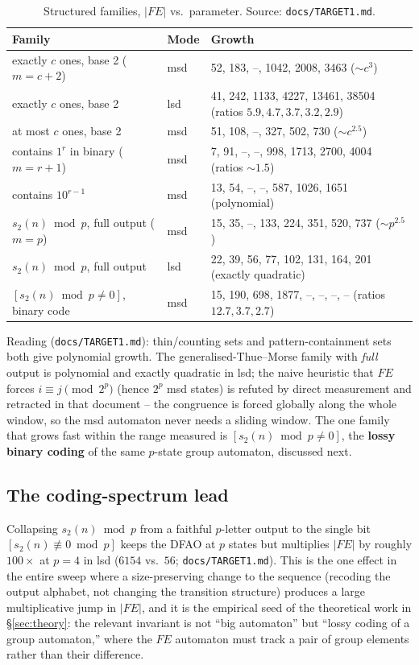 \documentclass[11pt]{article}
\begin{document}
\begin{table}[h]
\centering
\caption{Structured families, $|FE|$ vs.\ parameter. Source: \texttt{docs/TARGET1.md}.}
\label{tab:struct}
\begin{tabular}{@{}lll@{}}
\toprule
Family & Mode & Growth \\
\midrule
exactly $c$ ones, base 2 ($m=c+2$) & msd & 52, 183, --, 1042, 2008, 3463 ($\sim c^3$) \\
exactly $c$ ones, base 2 & lsd & 41, 242, 1133, 4227, 13461, 38504 (ratios $5.9,4.7,3.7,3.2,2.9$) \\
at most $c$ ones, base 2 & msd & 51, 108, --, 327, 502, 730 ($\sim c^{2.5}$) \\
contains $1^r$ in binary ($m=r+1$) & msd & 7, 91, --, --, 998, 1713, 2700, 4004 (ratios $\sim1.5$) \\
contains $10^{r-1}$ & msd & 13, 54, --, --, 587, 1026, 1651 (polynomial) \\
$s_2(n)\bmod p$, full output ($m=p$) & msd & 15, 35, --, 133, 224, 351, 520, 737 ($\sim p^{2.5}$) \\
$s_2(n)\bmod p$, full output & lsd & 22, 39, 56, 77, 102, 131, 164, 201 (exactly quadratic) \\
$[s_2(n)\bmod p \ne 0]$, binary code & msd & 15, 190, 698, 1877, --, --, --, -- (ratios $12.7,3.7,2.7$) \\
\bottomrule
\end{tabular}
\end{table}

Reading (\texttt{docs/TARGET1.md}): thin/counting sets and pattern-containment sets both
give polynomial growth. The generalised-Thue--Morse family with \emph{full} output is
polynomial and exactly quadratic in lsd; the naive heuristic that $FE$ forces
$i\equiv j\pmod{2^p}$ (hence $2^p$ msd states) is refuted by direct measurement and
retracted in that document -- the congruence is forced globally along the whole window,
so the msd automaton never needs a sliding window. The one family that grows fast within
the range measured is $[s_2(n)\bmod p\ne0]$, the \textbf{lossy binary coding} of the same
$p$-state group automaton, discussed next.

\subsection{The coding-spectrum lead}

Collapsing $s_2(n)\bmod p$ from a faithful $p$-letter output to the single bit
$[s_2(n)\not\equiv0\bmod p]$ keeps the DFAO at $p$ states but multiplies $|FE|$ by
roughly $100\times$ at $p=4$ in lsd ($6154$ vs.\ $56$; \texttt{docs/TARGET1.md}). This is
the one effect in the entire sweep where a size-preserving change to the sequence
(recoding the output alphabet, not changing the transition structure) produces a large
multiplicative jump in $|FE|$, and it is the empirical seed of the theoretical work in
\S\ref{sec:theory}: the relevant invariant is not ``big automaton'' but ``lossy coding of
a group automaton,'' where the $FE$ automaton must track a pair of group elements rather
than their difference.
\end{document}

